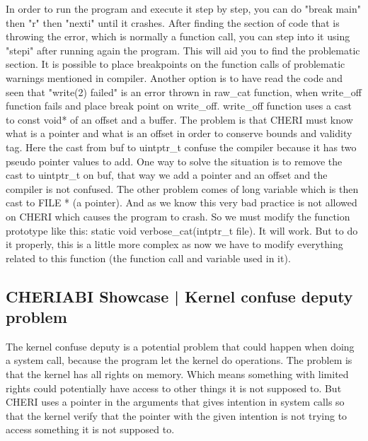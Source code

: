 \documentclass[a4paper, 11pt]{article}
\begin{document}
	
	 In order to run the program and execute it step by step, you can do "break main" then "r" then "nexti" until it crashes.
	 After finding the section of code that is throwing the error, which is normally a function call, you can step into it using "stepi" after running again the program. This will aid you to find the problematic section.
	 It is possible to place breakpoints on the function calls of problematic warnings mentioned in compiler.
	 Another option is to have read the code and seen that "write(2) failed" is an error thrown in raw\_cat function, when write\_off function fails and place break point on write\_off.
	 write\_off function uses a cast to const void* of an offset and a buffer. The problem is that CHERI must know what is a pointer and what is an offset in order to conserve bounds and validity tag. Here the cast from buf to uintptr\_t confuse the compiler because it has two pseudo pointer values to add.
	 One way to solve the situation is to remove the cast to uintptr\_t on buf, that way we add a pointer and an offset and the compiler is not confused.
	 The other problem comes of long variable which is then cast to FILE * (a pointer). And as we know this very bad practice is not allowed on CHERI which causes the program to crash.
	 So we must modify the function prototype like this: static void verbose\_cat(intptr\_t file). It will work. But to do it properly, this is a little more complex as now we have to modify everything related to this function (the function call and variable used in it).
		

	\subsection{CHERIABI Showcase | Kernel confuse deputy problem}

		The kernel confuse deputy is a potential problem that could happen when doing a system call, because the program let the kernel do operations. The problem is that the kernel has all rights on memory. Which means something with limited rights could potentially have access to other things it is not supposed to.
		But CHERI uses a pointer in the arguments that gives intention in system calls so that the kernel verify that the pointer with the given intention is not trying to access something it is not supposed to. 
\end{document}
